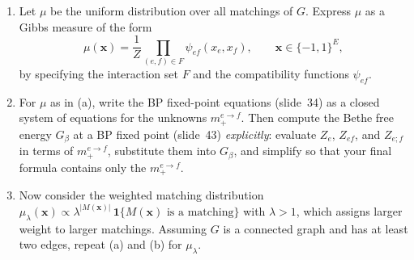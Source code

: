\documentclass[12pt]{article}
\theoremstyle{plain}
\theoremstyle{definition}
\begin{document}
\begin{enumerate}[label=(\alph*),itemsep=0.3em]
\item Let $\mu$ be the uniform distribution over all matchings of $G$. Express $\mu$ as a Gibbs measure of the form
\[
\mu(\mathbf{x})=\frac{1}{Z}\prod_{(e,f)\in F}\psi_{ef}(x_e,x_f),\qquad \mathbf{x}\in\{-1,1\}^{E},
\]
by specifying the interaction set $F$ and the compatibility functions $\psi_{ef}$.

\item For $\mu$ as in (a), write the BP fixed-point equations (slide~34) as a closed system of equations for the unknowns $m^{e\to f}_+$. Then compute the Bethe free energy $G_\beta$ at a BP fixed point (slide~43) \emph{explicitly}: evaluate $Z_e$, $Z_{ef}$, and $Z_{e;f}$ in terms of $m^{e\to f}_+$, substitute them into $G_\beta$, and simplify so that your final formula contains only the $m^{e\to f}_+$.

\item Now consider the weighted matching distribution $\mu_\lambda(\mathbf{x})\propto\lambda^{|M(\mathbf{x})|}\,\mathbf{1}\{M(\mathbf{x})\text{ is a matching}\}$ with $\lambda>1$, which assigns larger weight to larger matchings. Assuming $G$ is a connected graph and has at least two edges, repeat (a) and (b) for $\mu_\lambda$. 
\end{enumerate}

\newline 
\   %
\newpage
\end{document}
